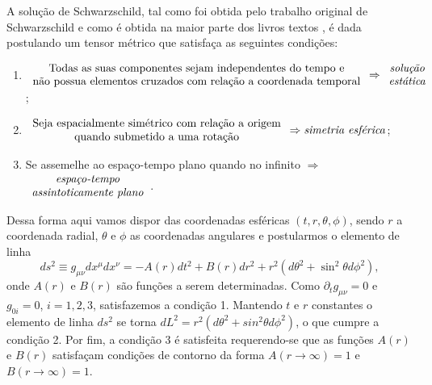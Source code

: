 \documentclass[12pt,a4paper,titlepage,brazil]{article}
\begin{document}
A solução de Schwarzschild, tal como foi obtida pelo trabalho original de Schwarzschild \cite{schwarzschild1916} e como é obtida na maior parte dos livros textos \cite{carroll2004, nightingale2006, hartle2003, dirac1996, wald2010}, é dada postulando um tensor métrico que satisfaça as seguintes condições:
\begin{enumerate}
 \item \hspace{-0.2cm}$\begin{array}{c} \textnormal{Todas as suas componentes sejam independentes do tempo e}\\
 \textnormal{não possua elementos cruzados com relação a coordenada temporal}\end{array} \Rightarrow \begin{array}{c} \textnormal{\emph{solução}}\\ \textnormal{\textit{estática}} \end{array}$;
 \item $\begin{array}{c} \textnormal{Seja espacialmente simétrico com relação a origem}\\
         \textnormal{quando submetido a uma rotação}\end{array} \Rightarrow \textnormal{\textit{simetria esférica}}$;
 \item Se assemelhe ao espaço-tempo plano quando no infinito $\Rightarrow$ $\begin{array}{c} \textnormal{\em espaço-tempo}\\
                                                                                  \textnormal{\em assintoticamente plano}\end{array}$.
\end{enumerate}

Dessa forma aqui vamos dispor das coordenadas esféricas $(t, r, \theta, \phi)$, sendo $r$ a coordenada radial, $\theta$ e $\phi$ as coordenadas angulares e postularmos o elemento de linha
\begin{equation}
 \label{eq:imp}
 ds^2 \equiv g_{\mu \nu} dx^{\mu} dx^{\nu} = - A(r) dt^2 + B(r) dr^2 + r^2 \left(d\theta^2 + \sin^2 \theta d\phi^2\right) ,
\end{equation}
onde $A(r)$ e $B(r)$ são funções a serem determinadas. Como $\partial_t g_{\mu \nu} = 0$ e $g_{0 i} = 0$, $i = 1, 2, 3$, satisfazemos a condição 1. Mantendo $t$ e $r$ constantes o elemento de linha $ds^2$ se torna $dL^2 = r^2 \left( d\theta^2 + sin^2 \theta d\phi^2 \right)$, o que cumpre a condição 2. Por fim, a condição 3 é satisfeita requerendo-se que as funções $A (r)$ e $B (r)$ satisfaçam condições de contorno da forma $A(r \rightarrow \infty) = 1$ e $B(r\rightarrow \infty) = 1$.
\end{document}
